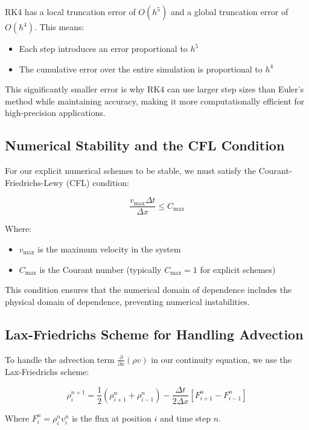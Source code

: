 \documentclass[a4paper,12pt]{article}
\begin{document}
RK4 has a local truncation error of $O(h^5)$ and a global truncation error of $O(h^4)$. This means:
\begin{itemize}
    \item Each step introduces an error proportional to $h^5$
    \item The cumulative error over the entire simulation is proportional to $h^4$
\end{itemize}

This significantly smaller error is why RK4 can use larger step sizes than Euler's method while maintaining accuracy, making it more computationally efficient for high-precision applications.

\subsection{Numerical Stability and the CFL Condition}

For our explicit numerical schemes to be stable, we must satisfy the Courant-Friedrichs-Lewy (CFL) condition:

\begin{equation}
\frac{v_{\max} \Delta t}{\Delta x} \leq C_{\max}
\end{equation}

Where:
\begin{itemize}
    \item $v_{\max}$ is the maximum velocity in the system
    \item $C_{\max}$ is the Courant number (typically $C_{\max} = 1$ for explicit schemes)
\end{itemize}

This condition ensures that the numerical domain of dependence includes the physical domain of dependence, preventing numerical instabilities.

\subsection{Lax-Friedrichs Scheme for Handling Advection}

To handle the advection term $\frac{\partial}{\partial x}(\rho v)$ in our continuity equation, we use the Lax-Friedrichs scheme:

\begin{equation}
\rho_i^{n+1} = \frac{1}{2}(\rho_{i+1}^n + \rho_{i-1}^n) - \frac{\Delta t}{2\Delta x}[F_{i+1}^n - F_{i-1}^n]
\end{equation}

Where $F_i^n = \rho_i^n v_i^n$ is the flux at position $i$ and time step $n$.
\end{document}
